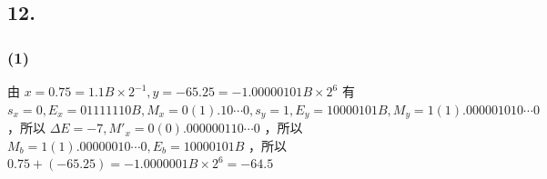 \documentclass[12pt, a4paper]{ctexart}
\begin{document}
\subsection*{12.}

\subsubsection*{(1)}

由
$x=0.75=1.1B\times2^{-1},y=-65.25=-1.00000101B\times2^6$
有
$s_x=0,E_x=01111110B,M_x=0(1).10\cdots0,
s_y=1,E_y=10000101B,M_y=1(1).000001010\cdots0$
，所以
$\Delta E=-7,M'_x=0(0).000000110\cdots0$
，所以
$M_b=1(1).00000010\cdots0,E_b=10000101B$
，所以
$0.75+(-65.25)=-1.0000001B\times2^6=-64.5$
\end{document}
